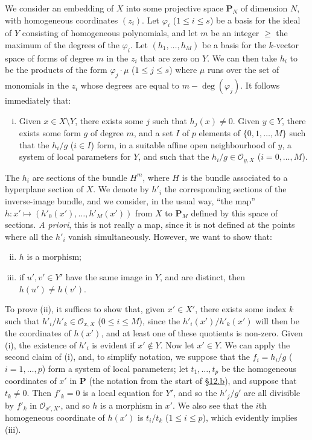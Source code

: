 \documentclass{article}
\theoremstyle{plain}
\theoremstyle{definition}
\newcommand{\scr}[1]{{\mathscr{#1}}}
\newcommand{\PP}{\mathbf{P}}
\renewcommand{\geq}{\geqslant}
\renewcommand{\leq}{\leqslant}
\newcommand{\oldpage}[1]{\marginpar{\footnotesize$\Big\vert$ \textit{p.~#1}}}
\begin{document}
We consider an embedding of $X$ into some projective space $\PP_N$ of dimension $N$, with homogeneous coordinates $(z_i)$.
Let $\varphi_i$ ($1\leq i\leq s$) be a basis for the ideal of $Y$ consisting of homogeneous polynomials, and let $m$ be an integer $\geq$ the maximum of the degrees of the $\varphi_i$.
Let $(h_1,\ldots,h_M)$ be a basis for the $k$-vector space of forms of degree $m$ in the $z_i$ that are zero on $Y$.
We can then take $h_i$ to be the products of the form $\varphi_j\cdot\mu$ ($1\leq j\leq s$) where $\mu$ runs over the set of monomials in the $z_i$ whose degrees are equal to $m-\deg(\varphi_j)$.
It follows immediately that:
\begin{enumerate}[(i)]
  \item Given $x\in X\setminus Y$, there exists some $j$ such that $h_j(x)\neq0$.
    Given $y\in Y$, there exists some form $g$ of degree $m$, and a set $I$ of $p$ elements of $\{0,1,\ldots,M\}$ such that the $h_i/g$ ($i\in I$) form, in a suitable affine open neighbourhood of $y$, a system of local parameters for $Y$, and such that the $h_i/g\in\scr{O}_{y,X}$ ($i=0,\ldots,M$).
\end{enumerate}

The $h_i$ are  sections of the bundle $H^m$, where $H$ is the bundle associated to a hyperplane section of $X$.
We denote by $h'_i$ the corresponding sections of the inverse-image bundle, and we consider, in the usual way, ``the map'' $h\colon x'\mapsto(h'_0(x'),\ldots,h'_M(x'))$ from $X$ to $\PP_M$ defined by this space of sections.
\emph{A priori}, this is not really a map, since it is not defined at the points where all the $h'_i$ vanish simultaneously.
However, we want to show that:

\begin{enumerate}[(i)]
  \setcounter{enumi}{1}
  \item $h$ is a morphism;
  \item if $u',v'\in Y'$ have the same image in $Y$, and are distinct, then $h(u')\neq h(v')$.
\end{enumerate}

To prove (ii), it suffices to show that, given $x'\in X'$, there exists some index $k$ such that $h'_i/h'_k\in\scr{O}_{x,X}$ ($0\leq i\leq M$), since the $h'_i(x')/h'_k(x')$ will then be the coordinates of $h(x')$, and at least one of these quotients is non-zero.
Given (i), the existence of $h'_i$ is evident if $x'\not\in Y$.
Now let $x'\in Y$.
We can apply the second claim of (i), and, to simplify notation,
\oldpage{128}
we suppose that the $f_i=h_i/g$ ($i=1,\ldots,p$) form a system of local parameters;
let $t_1,\ldots,t_p$ be the homogeneous coordinates of $x'$ in $\PP$ (the notation from the start of \hyperref[subsection12b]{\S12.b}), and suppose that $t_k\neq0$.
Then $f'_k=0$ is a local equation for $Y'$, and so the $h'_j/g'$ are all divisible by $f'_k$ in $\scr{O}_{x',X'}$, and so $h$ is a morphism in $x'$.
We also see that the $i$th homogeneous coordinate of $h(x')$ is $t_i/t_k$ ($1\leq i\leq p$), which evidently implies (iii).
\end{document}
